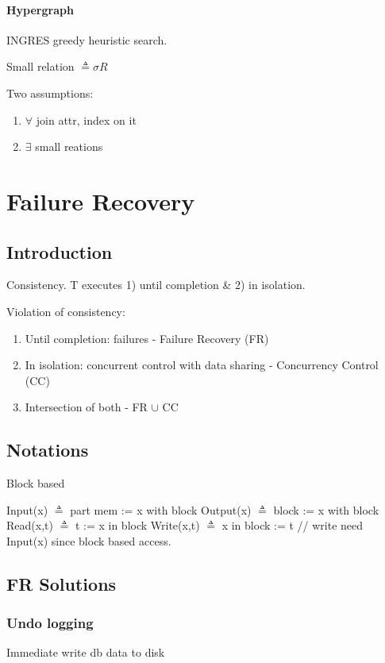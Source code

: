 \documentclass[a4paper]{report}
\begin{document}
\subsubsection{Hypergraph}
INGRES greedy heuristic search. 

Small relation $\triangleq \sigma R$  

Two assumptions:
\begin{enumerate}
\item $\forall$ join attr, index on it
\item $\exists$  small reations
\end{enumerate}

\chapter{Failure Recovery}
\section*{Introduction}
Consistency. T executes 1) until completion \& 2) in isolation. 

Violation of consistency: 
\begin{enumerate}
\item Until completion: failures - Failure Recovery (FR)
\item In isolation: concurrent control with data sharing - Concurrency Control
(CC)
\item Intersection of both - FR $\cup$ CC
\end{enumerate}

\section{Notations}
Block based 
\begin{enumerate}
\treeitem Input(x) $\triangleq$ part mem := x with block 
\treeitem Output(x) $\triangleq$ block := x with block
\treeitem Read(x,t) $\triangleq$ t := x in block 
\treeitem Write(x,t) $\triangleq$ x in block := t // write need Input(x) since block based access.
\end{enumerate}

\section{FR Solutions}
\subsection{Undo logging}
Immediate write db data to disk 
\end{document}
